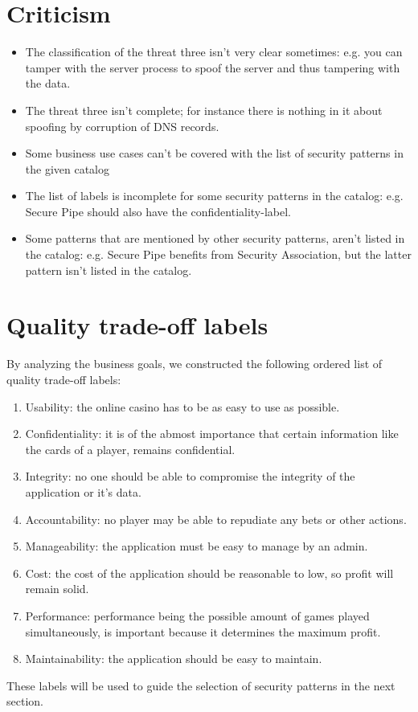 \documentclass[a4paper,11pt]{report}
\begin{document}
\section{Criticism}
\begin{itemize}
\item The classification of the threat three isn't very clear sometimes: e.g. you can tamper with the server process
to spoof the server and thus tampering with the data.
\item The threat three isn't complete; for instance there is nothing in it about spoofing by corruption of 
DNS records.
\item Some business use cases can't be covered with the list of security patterns in the given catalog
\item The list of labels is incomplete for some security patterns in the catalog: e.g. Secure Pipe should also have
the confidentiality-label.
\item Some patterns that are mentioned by other security patterns, aren't listed in the catalog: e.g. Secure Pipe 
benefits from Security Association, but the latter pattern isn't listed in the catalog.
\end{itemize}
\section{Quality trade-off labels}
By analyzing the business goals, we constructed the following ordered list of quality trade-off labels:
\begin{enumerate}
\item Usability: the online casino has to be as easy to use as possible.
\item Confidentiality: it is of the abmost importance that certain information like the cards of a player, remains
confidential.
\item Integrity: no one should be able to compromise the integrity of the application or it's data.
\item Accountability: no player may be able to repudiate any bets or other actions.
\item Manageability: the application must be easy to manage by an admin.
\item Cost: the cost of the application should be reasonable to low, so profit will remain solid.
\item Performance: performance being the possible amount of games played simultaneously, is important because it
determines the maximum profit.
\item Maintainability: the application should be easy to maintain.
\end{enumerate}
These labels will be used to guide the selection of security patterns in the next section.
\end{document}
